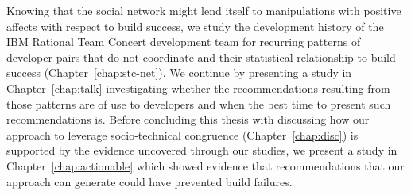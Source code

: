 Knowing that the social network might lend itself to manipulations with positive affects with respect to build success, we study the development history of the IBM Rational Team Concert development team for recurring patterns of developer pairs that do not coordinate and their statistical relationship to build success (Chapter~\ref{chap:stc-net}).
We continue by presenting a study in Chapter~\ref{chap:talk} investigating whether the recommendations resulting from those patterns are of use to developers and when the best time to present such recommendations is.
Before concluding this thesis with discussing how our approach to leverage socio-technical congruence (Chapter~\ref{chap:disc}) is supported by the evidence uncovered through our studies, we present a study in Chapter~\ref{chap:actionable} which showed evidence that 
recommendations that our approach can generate could have prevented build failures.






















